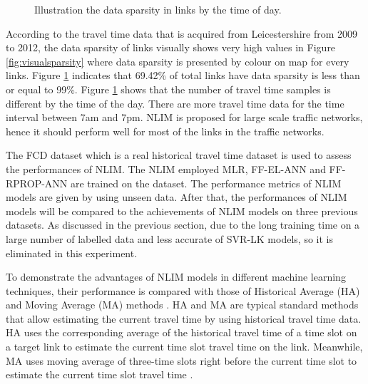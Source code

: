 \documentclass[journal]{IEEEtran}
\begin{document}
\begin{figure}[!t]
\centering
{}
\caption{Illustration the data sparsity in links by the time of day.}
\label{fig:sparsityplotFCD}
\end{figure}

According to the travel time data that is acquired from Leicestershire from 2009 to 2012, the data sparsity of links visually shows very high values in Figure \ref{fig:visualsparsity} where data sparsity is presented by colour on map for every links. Figure \ref{fig:sparsityplotFCD} indicates that 69.42\% of total links have data sparsity is less than or equal to 99\%. Figure \ref{fig:sparsityplotFCD} shows that the number of travel time samples is different by the time of the day. There are more travel time data for the time interval between 7am and 7pm. NLIM is proposed for large scale traffic networks, hence it should perform well for most of the links in the traffic networks.

The FCD dataset which is a real historical travel time dataset is used to assess the performances of NLIM. The NLIM employed MLR, FF-EL-ANN and FF-RPROP-ANN are trained on the dataset. The performance metrics of NLIM models are given by using unseen data. After that, the performances of NLIM models will be compared to the achievements of NLIM models on three previous datasets. As discussed in the previous section, due to the long training time on a large number of labelled data and less accurate of SVR-LK models, so it is eliminated in this experiment.

To demonstrate the advantages of NLIM models in different machine learning techniques, their performance is compared with those of Historical Average (HA) and Moving Average (MA) methods \cite{Tang2018}. HA and MA are typical standard methods that allow estimating the current travel time by using historical travel time data. HA uses the corresponding average of the historical travel time of a time slot on a target link to estimate the current time slot travel time on the link. Meanwhile, MA uses moving average of three-time slots right before the current time slot to estimate the current time slot travel time \cite{Tang2018}.
\end{document}
